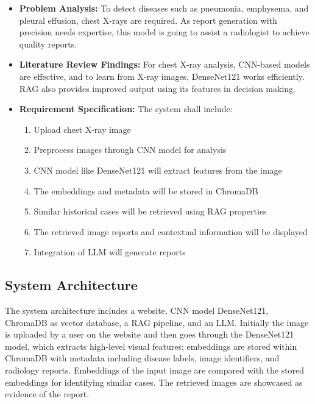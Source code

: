 \begin{itemize}
    \item \textbf{Problem Analysis:} To detect diseases such as pneumonia, emphysema, and
    pleural effusion, chest X-rays are required. As report generation with precision needs
    expertise, this model is going to assist a radiologist to achieve quality reports.

    \item \textbf{Literature Review Findings:} For chest X-ray analysis, CNN-based models are
    effective, and to learn from X-ray images, DenseNet121 works efficiently. RAG also
    provides improved output using its features in decision making.

    \item \textbf{Requirement Specification:} The system shall include:
    \begin{enumerate}
        \item Upload chest X-ray image
        \item Preprocess images through CNN model for analysis
        \item CNN model like DenseNet121 will extract features from the image
        \item The embeddings and metadata will be stored in ChromaDB
        \item Similar historical cases will be retrieved using RAG properties
        \item The retrieved image reports and contextual information will be displayed
        \item Integration of LLM will generate reports
    \end{enumerate}
\end{itemize}

\subsection{System Architecture}

The system architecture includes a website, CNN model DenseNet121, ChromaDB as vector
database, a RAG pipeline, and an LLM. Initially the image is uploaded by a user on the website
and then goes through the DenseNet121 model, which extracts high-level visual features;
embeddings are stored within ChromaDB with metadata including disease labels, image
identifiers, and radiology reports. Embeddings of the input image are compared with the stored
embeddings for identifying similar cases. The retrieved images are showcased as evidence of
the report.

